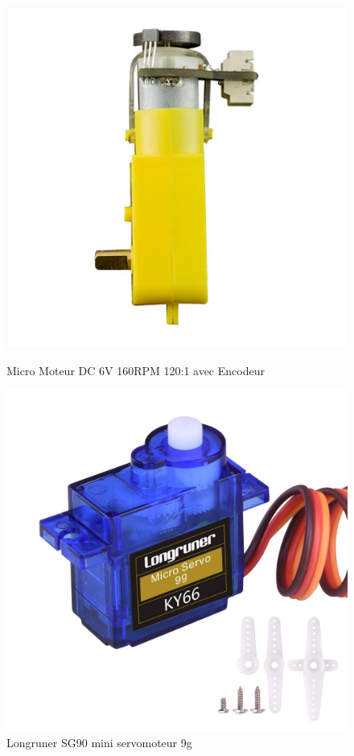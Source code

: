 \documentclass[a4paper,11pt]{article}
\begin{document}
\begin{figure}[H]
    \begin{minipage}[c]{.46\linewidth}
        \includegraphics[scale = 0.2]{moteurs_encod.jpg}
    \caption{Micro Moteur DC 6V 160RPM 120:1 avec Encodeur \cite{moteur_encodeur}}
    \label{fig:moteur_encodeur}
    \end{minipage}
    \hfill
    \begin{minipage}[c]{.46\linewidth}
        \centering
    \includegraphics[scale = 0.1]{servo.jpg}
    \caption{Longruner SG90 mini servomoteur 9g \cite{servos} }
    \label{fig:servo}
    \end{minipage}
\end{figure}
\end{document}
